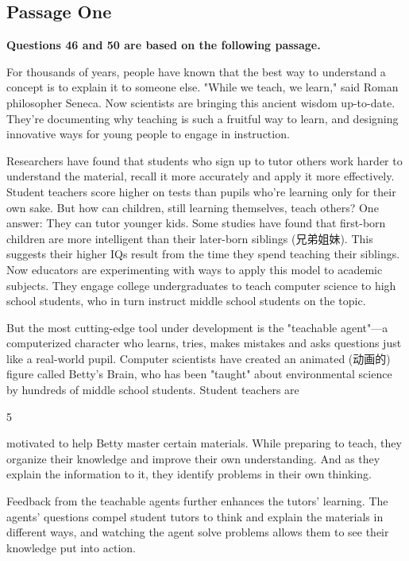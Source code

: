 \documentclass[UTF8,11pt]{ctexart}
\begin{document}
\subsection*{\textbf{Passage One}}


\textbf{Questions 46 and 50 are based on the following passage.}


For thousands of years, people have known that the best way to understand a concept is to explain it to someone else. "While we teach, we learn," said Roman philosopher Seneca. Now scientists are bringing this ancient wisdom up-to-date. They're documenting why teaching is such a fruitful way to learn, and designing innovative ways for young people to engage in instruction.


Researchers have found that students who sign up to tutor others work harder to understand the material, recall it more accurately and apply it more effectively. Student teachers score higher on tests than pupils who're learning only for their own sake. But how can children, still learning themselves, teach others? One answer: They can tutor younger kids. Some studies have found that first-born children are more intelligent than their later-born siblings (兄弟姐妹). This suggests their higher IQs result from the time they spend teaching their siblings. Now educators are experimenting with ways to apply this model to academic subjects. They engage college undergraduates to teach computer science to high school students, who in turn instruct middle school students on the topic.


But the most cutting-edge tool under development is the "teachable agent"—a computerized character who learns, tries, makes mistakes and asks questions just like a real-world pupil. Computer scientists have created an animated (动画的) figure called Betty's Brain, who has been "taught" about environmental science by hundreds of middle school students. Student teachers are


5


motivated to help Betty master certain materials. While preparing to teach, they organize their knowledge and improve their own understanding. And as they explain the information to it, they identify problems in their own thinking.


Feedback from the teachable agents further enhances the tutors' learning. The agents' questions compel student tutors to think and explain the materials in different ways, and watching the agent solve problems allows them to see their knowledge put into action.
\end{document}
